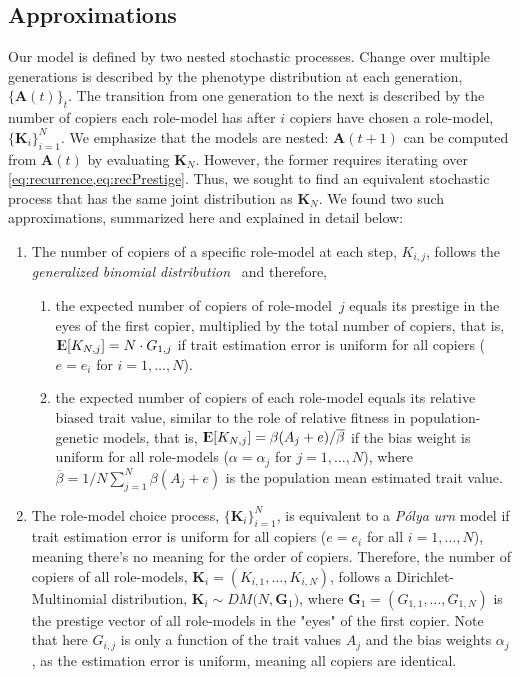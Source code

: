 \documentclass[12pt]{extarticle}
\DeclareMathOperator*{\E}{{\rm I\kern-.3em E}}
\let\vec\mathbf
\begin{document}
\subsection*{Approximations}
Our model is defined by two nested stochastic processes. Change over multiple generations is described by the phenotype distribution at each generation, $\{\vec{A}(t)\}_t$. The transition from one generation to the next is described by the number of copiers each role-model has after $i$ copiers have chosen a role-model, $\{\vec{K}_i\}_{i=1}^N$.
We emphasize that the models are nested: $\vec{A}(t+1)$ can be computed from $\vec{A}(t)$ by evaluating $\vec{K}_{N}$. However, the former requires iterating over \cref{eq:recurrence,eq:recPrestige}. Thus, we sought to find an equivalent stochastic process that has the same joint distribution as $\vec{K}_{N}$. 
We found two such approximations, summarized here and explained in detail below:
\begin{enumerate}
\item 
The number of copiers of a specific role-model at each step, $K_{i,j}$, follows the {\em generalized binomial distribution}~\citep{GBD} and therefore,
\begin{enumerate}\item the expected number of copiers of role-model~$j$ equals its prestige in the eyes of the first copier, multiplied by the total number of copiers, that is,
$\E[K_{N,j}] = N \cdot G_{1,j}$ if trait estimation error is uniform for all copiers ($e=e_i$ for $i=1, \ldots, N$).
\item the expected number of copiers of each role-model equals its relative biased trait value, similar to the role of relative fitness in population-genetic models, that is, $\E[K_{N,j}] = \beta(A_j+e) / \overline{\beta}$ if the bias weight is uniform for all role-models ($\alpha=\alpha_j$ for $j=1,\ldots,N$), where $\overline{\beta}=1/N \sum_{j=1}^{N}{\beta(A_j+e)}$ is the population mean estimated trait value. 
\end{enumerate}
\item The role-model choice process, $\{\vec{K}_{i}\}_{i=1}^{N}$, is equivalent to a {\em P\'{o}lya urn} model if trait estimation error is uniform for all copiers ($e=e_i$ for all $i=1, \ldots, N$), meaning there's no meaning for the order of copiers. 
Therefore, the number of copiers of all role-models, $\vec{K}_i = (K_{i,1}, \ldots, K_{i,N})$, follows a Dirichlet-Multinomial distribution,
$\vec{K}_i \sim \mathit{DM}\big(N, \vec{G}_1\big)$, where $\vec{G}_1 = (G_{1,1}, \ldots, G_{1,N})$ is the prestige vector of all role-models in the "eyes" of the first copier.
Note that here $G_{i,j}$ is only a function of the trait values $A_j$ and the bias weights $\alpha_j$, as the estimation error is uniform, meaning all copiers are identical.
\end{enumerate}
\end{document}
